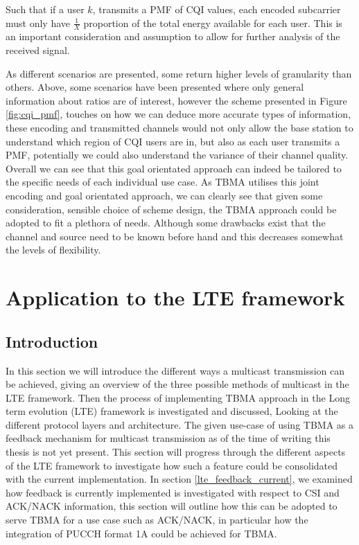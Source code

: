 \documentclass{article}
\begin{document}
Such that if a user $k$, transmits a PMF of CQI values, each encoded subcarrier must only have $\frac{1}{X}$ proportion of the total energy available for each user. This is an important consideration and assumption to allow for further analysis of the received signal. 

As different scenarios are presented, some return higher levels of granularity than others. Above, some scenarios have been presented where only general information about ratios are of interest, however the scheme presented in Figure \ref{fig:cqi_pmf}, touches on how we can deduce more accurate types of information, these encoding and transmitted channels would not only allow the base station to understand which region of CQI users are in, but also as each user transmits a PMF, potentially we could also understand the variance of their channel quality.  Overall we can see that this goal orientated approach can indeed be tailored to the specific needs of each individual use case. As TBMA utilises this joint encoding and goal orientated approach, we can clearly see that given some consideration, sensible choice of scheme design, the TBMA approach could be adopted to fit a plethora of needs. Although some drawbacks exist that the channel and source need to be known before hand and this decreases somewhat the levels of flexibility.

\section{Application to the LTE framework}\label{lte_app}
\subsection{Introduction}
In this section we will introduce the different ways a multicast transmission can be achieved, giving an overview of the three possible methods of multicast in the LTE framework. Then the process of implementing TBMA approach in the Long term evolution (LTE) framework is investigated and discussed, Looking at the different protocol layers and architecture. The given use-case of using TBMA as a feedback mechanism for multicast transmission as of the time of writing this thesis is not yet present. This section will progress through the different aspects of the LTE framework to investigate how such a feature could be consolidated with the current implementation. In section \cref{lte_feedback_current}, we examined how feedback is currently implemented is investigated with respect to CSI and ACK/NACK information, this section will outline how this can be adopted to serve TBMA for a use case such as ACK/NACK, in particular how the integration of PUCCH format 1A could be achieved for TBMA.
\end{document}
